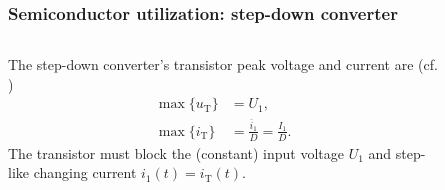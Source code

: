 \begin{frame}
    \frametitle{Semiconductor utilization: step-down converter}
    \begin{columns}
        \begin{column}{0.5\textwidth}
             The  step-down converter's transistor peak voltage and current are (cf. )
            \begin{equation}
                \begin{split}
                    \max\{u_\mathrm{T}\} &= U_1,\\
                    \max\{i_\mathrm{T}\} &= \frac{\overline{i}_1}{D}= \frac{I_1}{D}.                                            
                \end{split}
                \label{eq:step-down-converter-transistor-peak-voltage-current}
            \end{equation}
            The transistor must block the (constant) input voltage $U_1$ and step-like changing current $i_1(t)=i_\mathrm{T}(t)$. 
        \end{column}
        \begin{column}{0.5\textwidth}
            \begin{figure}
\end{figure}
\end{column}
\end{columns}
\end{frame}

